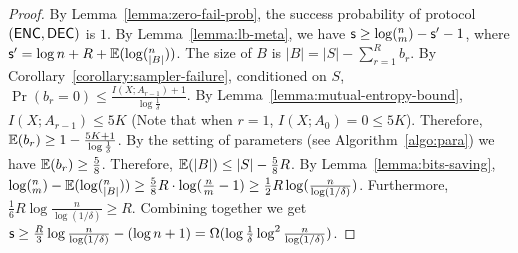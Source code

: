 \begin{proof}
  By Lemma~\ref{lemma:zero-fail-prob}, the success probability of protocol $(\textsf{ENC},\textsf{DEC})$ is $1$. 
  By Lemma~\ref{lemma:lb-meta}, we have $\textsf{s}\ge \log (^n_m) - \textsf{s}' -1$, where $\textsf{s}'=\log n + R+ \operatorname*{\mathbb{E}}(\log (^n_{|B|}))$. 
  The size of $B$ is $|B|=|S|-\sum_{r=1}^{R}{b_r}$.
  By Corollary~\ref{corollary:sampler-failure}, conditioned on $S$, $\Pr(b_r=0)\le \frac{I(X;A_{r-1})+1}{\log\frac{1}{\delta}}$. 
  By Lemma~\ref{lemma:mutual-entropy-bound}, $I(X;A_{r-1})\le 5K$ (Note that when $r=1$, $I(X;A_0)=0\le 5K$). Therefore, $\operatorname*{\mathbb{E}}(b_r)\ge 1-\frac{5K+1}{\log\frac{1}{\delta}}$.
  By the setting of parameters (see Algorithm~\ref{algo:para}) we have $\operatorname*{\mathbb{E}}(b_r)\ge \frac{5}{8}$. Therefore, $\operatorname*{\mathbb{E}}(|B|)\le |S|-\frac{5}{8}R$. 
  By Lemma~\ref{lemma:bits-saving}, $\log (^n_m)-\operatorname*{\mathbb{E}}(\log (^n_{|B|}))\ge \frac{5}{8}R\cdot \log (\frac{n}{m}-1) \ge \frac{1}{2}R\log (\frac{n}{\log(1/\delta)})$. 
  Furthermore, $\frac{1}{6}R\log \frac{n}{\log (1/\delta)} \ge R$.
  Combining together we get $\textsf{s} \ge \frac{R}{3}\log \frac{n}{\log(1/\delta)} -(\log n + 1)  =\Omega(\log \frac{1}{\delta}\log^2 \frac{n}{\log (1/\delta)} )$.
\end{proof}